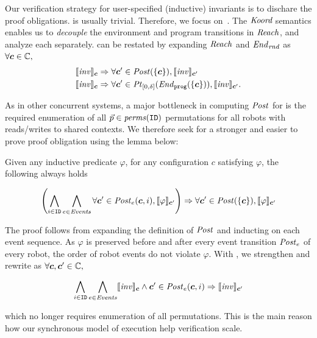Our  verification strategy for user-specified  (inductive) invariants is to dischare the proof obligations.
 is usually trivial. Therefore, we focus on~. The $\emph{Koord}$ semantics enables us to \emph{decouple} the environment and program transitions in $\mathit{Reach}$, and analyze each separately.  can be restated by expanding $\mathit{Reach}$ and $\mathit{End}_\mathit{rnd}$ as $\forall \mathit{\boldsymbol{c}} \in \mathbb{C},$
\begin{align}
\llbracket\mathit{inv}\rrbracket_{\mathit{\boldsymbol{c}}} &\Rightarrow \forall \mathit{\boldsymbol{c}}' \in \mathit{Post}(\left\{\mathit{\boldsymbol{c}}\right\}), \llbracket\mathit{inv}\rrbracket_{\mathit{\boldsymbol{c}}'}\label{po:ind-hyp-prog}\\
\llbracket\mathit{inv}\rrbracket_{\mathit{\boldsymbol{c}}} &\Rightarrow \forall \mathit{\boldsymbol{c}}' \in \mathit{Pt}_{[0,\delta]}(\mathit{End}_{\mathtt{prog}}(\left\{\mathit{\boldsymbol{c}}\right\})), \llbracket\mathit{inv}\rrbracket_{\mathit{\boldsymbol{c}}'}.\label{po:ind-hyp-env}
\end{align}

As in other concurrent systems, a major bottleneck in computing $\mathit{Post}$ for  is the required enumeration of all $\vec{p}\in \mathit{perms}(\texttt{ID})$ permutations for all robots with reads/writes to shared contexts. We therefore seek for a stronger and easier to prove proof obligation using the lemma below:
\begin{lemma}
   \label{lem:noninter}
Given any inductive predicate $\varphi$,
for any configuration $c$ satisfying $\varphi$, the following always holds
\begin{small}
\[
\left(\bigwedge_{i\in \texttt{ID}}\bigwedge_{e \in \mathit{Events}} \forall \mathit{\boldsymbol{c}}' \in \mathit{Post}_e(\mathit{\boldsymbol{c}}, i), \llbracket\varphi\rrbracket_{\mathit{\boldsymbol{c}}'}\right)
    \Rightarrow \forall \mathit{\boldsymbol{c}}' \in \mathit{Post}(\left\{\mathit{\boldsymbol{c}}\right\}), \llbracket\varphi\rrbracket_{\mathit{\boldsymbol{c}}'}
\]
\end{small}
\end{lemma}
The proof follows from expanding the definition of $\mathit{Post}$ and inducting on each event sequence. 
As $\varphi$ is preserved before and after every event transition $\mathit{Post}_e$ of every robot,
the order of robot events do not violate $\varphi$.
With , we strengthen and rewrite  as $\forall \mathit{\boldsymbol{c}}, \mathit{\boldsymbol{c}}' \in \mathbb{C},$
\begin{small}
\begin{equation}
\bigwedge_{i\in \texttt{ID}}\bigwedge_{e \in \mathit{Events}} \llbracket\mathit{inv}\rrbracket_{\mathit{\boldsymbol{c}}} \land \mathit{\boldsymbol{c}}' \in \mathit{Post}_e(\mathit{\boldsymbol{c}}, i)
    \Rightarrow \llbracket\mathit{inv}\rrbracket_{\mathit{\boldsymbol{c}}'}\label{po:ind-hyp-event}
\end{equation}
\end{small}%
which no longer requires enumeration of all permutations.
This is the main reason how our synchronous model of execution help verification scale.

